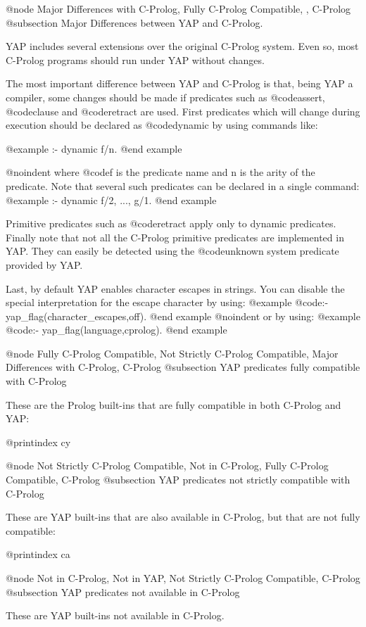 {{{{{{{{{@node Major Differences with C-Prolog, Fully C-Prolog Compatible, , C-Prolog
@subsection Major Differences between YAP and C-Prolog.

YAP includes several extensions over the original C-Prolog system. Even
so, most C-Prolog programs should run under YAP without changes.

The most important difference between YAP and C-Prolog is that, being
YAP a compiler, some changes should be made if predicates such as
@code{assert}, @code{clause} and @code{retract} are used. First
predicates which will change during execution should be declared as
@code{dynamic} by using commands like:

@example
:- dynamic f/n.
@end example

@noindent where @code{f} is the predicate name and n is the arity of the
predicate. Note that  several such predicates can be declared in a
single command:
@example
 :- dynamic f/2, ..., g/1.
@end example

Primitive predicates such as @code{retract} apply only to dynamic
predicates.  Finally note that not all the C-Prolog primitive predicates
are implemented in YAP. They can easily be detected using the
@code{unknown} system predicate provided by YAP.

Last, by default YAP enables character escapes in strings. You can
disable the special interpretation for the escape character by using:
@example
@code{:- yap_flag(character_escapes,off).}
@end example
@noindent
or by using:
@example
@code{:- yap_flag(language,cprolog).}
@end example

@node Fully C-Prolog Compatible, Not Strictly C-Prolog Compatible, Major Differences with C-Prolog, C-Prolog
@subsection YAP predicates fully compatible with C-Prolog

These are the Prolog built-ins that are fully compatible in both
C-Prolog and YAP:

@printindex cy

@node Not Strictly C-Prolog Compatible, Not in C-Prolog, Fully C-Prolog Compatible, C-Prolog
@subsection YAP predicates not strictly compatible with C-Prolog

These are YAP built-ins that are also available in C-Prolog, but
that are not fully compatible:

@printindex ca

@node Not in C-Prolog, Not in YAP, Not Strictly C-Prolog Compatible, C-Prolog
@subsection YAP predicates not available in C-Prolog

These are YAP built-ins not available in C-Prolog.

}}}}}}}}}
